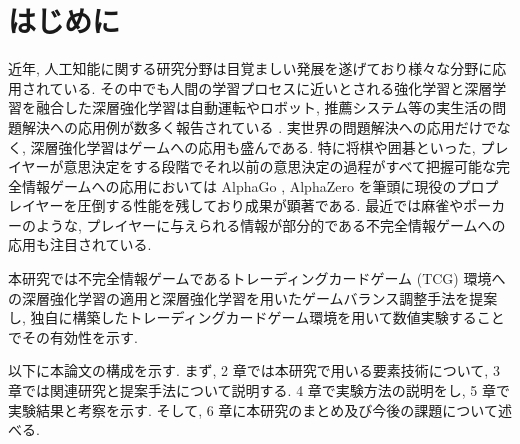 \newpage
\changeindent{0cm}
\section{はじめに}
\changeindent{2cm}

近年, 人工知能に関する研究分野は目覚ましい発展を遂げており様々な分野に応用されている. その中でも人間の学習プロセスに近いとされる強化学習と深層学習を融合した深層強化学習は自動運転やロボット, 推薦システム等の実生活の問題解決への応用例が数多く報告されている \cite{Vehicle}\cite{robotics}\cite{recommendation}. 
実世界の問題解決への応用だけでなく, 深層強化学習はゲームへの応用も盛んである.
特に将棋や囲碁といった, プレイヤーが意思決定をする段階でそれ以前の意思決定の過程がすべて把握可能な完全情報ゲームへの応用においては AlphaGo \cite{AlphaGo}, AlphaZero \cite{AlphaZero} を筆頭に現役のプロプレイヤーを圧倒する性能を残しており成果が顕著である. 
最近では麻雀やポーカーのような, プレイヤーに与えられる情報が部分的である不完全情報ゲームへの応用も注目されている.
\par
本研究では不完全情報ゲームであるトレーディングカードゲーム (TCG) 環境への深層強化学習の適用と深層強化学習を用いたゲームバランス調整手法を提案し, 独自に構築したトレーディングカードゲーム環境を用いて数値実験することでその有効性を示す. 
\par
以下に本論文の構成を示す.  まず, 2 章では本研究で用いる要素技術について, 3 章では関連研究と提案手法について説明する. 4 章で実験方法の説明をし, 5 章で実験結果と考察を示す. そして, 6 章に本研究のまとめ及び今後の課題について述べる.